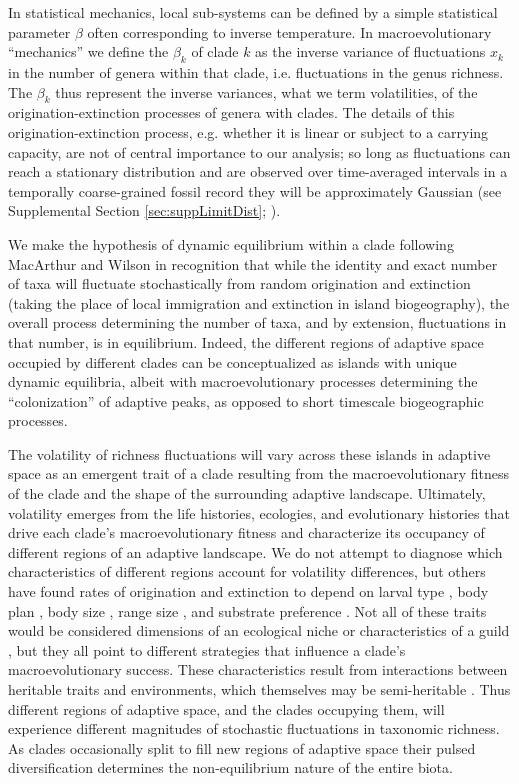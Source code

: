 \documentclass[12pt]{article}
\let\citep=\cite
\begin{document}
In statistical mechanics, local sub-systems can be defined by a simple
statistical parameter $\beta$ often corresponding to inverse
temperature. In macroevolutionary ``mechanics'' we define the
$\beta_k$ of clade $k$ as the inverse variance of fluctuations $x_k$
in the number of genera within that clade, i.e. fluctuations in the
genus richness.  The $\beta_k$ thus represent the inverse variances,
what we term volatilities, of the origination-extinction processes of
genera with clades. The details of this origination-extinction
process, e.g. whether it is linear or subject to a carrying capacity,
are not of central importance to our analysis; so long as fluctuations
can reach a stationary distribution and are observed over
time-averaged intervals in a temporally coarse-grained fossil record
they will be approximately Gaussian (see Supplemental Section
\ref{sec:suppLimitDist}; \citep{grassmann1987}).

We make the hypothesis of dynamic equilibrium within a clade following
MacArthur and Wilson \citep{macWilson} in recognition that while the
identity and exact number of taxa will fluctuate stochastically from
random origination and extinction (taking the place of local
immigration and extinction in island biogeography), the overall
process determining the number of taxa, and by extension, fluctuations
in that number, is in equilibrium. Indeed, the different regions of
adaptive space occupied by different clades can be conceptualized as
islands with unique dynamic equilibria, albeit with macroevolutionary
processes determining the ``colonization'' of adaptive peaks, as
opposed to short timescale biogeographic processes.

The volatility of richness fluctuations will vary across these islands
in adaptive space as an emergent trait of a clade resulting from the
macroevolutionary fitness of the clade and the shape of the
surrounding adaptive landscape. Ultimately, volatility emerges from
the life histories, ecologies, and evolutionary histories that
drive each clade's macroevolutionary fitness and characterize its 
occupancy of different regions of an adaptive landscape. We do not
attempt to diagnose which characteristics of different regions account
for volatility differences, but others have found rates of origination
and extinction to depend on larval type \citep{jablonski2008}, body
plan \citep{erwin2012}, body size \citep{harnik2011}, range size
\citep{harnik2011, foote2008paleobiol}, and substrate preference
\citep{hopkins2014}. Not all of these traits would be considered
dimensions of an ecological niche or characteristics of a guild
\citep{bambach1983, bambach2007, bush2007}, but they all point to
different strategies that influence a clade's macroevolutionary
success. These characteristics result from interactions between
heritable traits and environments, which themselves may be
semi-heritable \citep{nicheCons}. Thus different regions of adaptive
space, and the clades occupying them, will experience different
magnitudes of stochastic fluctuations in taxonomic richness. As clades
occasionally split to fill new regions of adaptive space their pulsed
diversification determines the non-equilibrium nature of the entire
biota.
\end{document}
